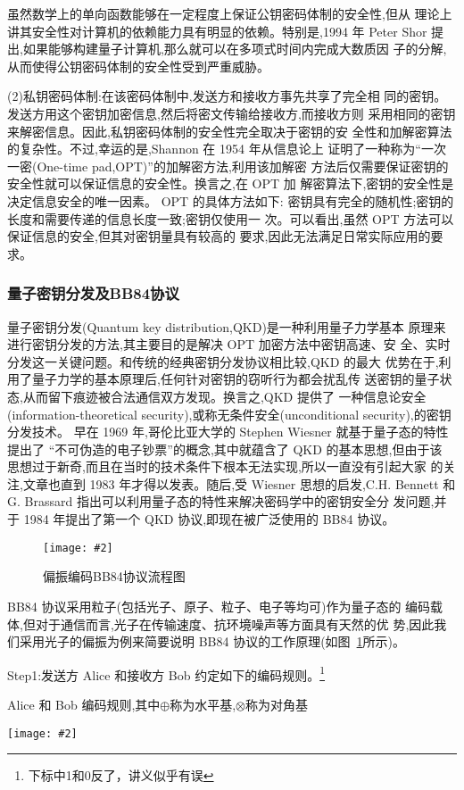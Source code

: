 \documentclass[11pt,a4paper]{ctexart}
\newcommand{\cpic}[2]{
\begin{center}
\texttt{[image: \#2]}
\end{center}
}
\newcommand{\cpicn}[3]
{
\begin{figure}[H]
\cpic{#1}{#2}
\caption{\color{red}#3\label{#2}}
\end{figure}
}
\begin{document}
虽然数学上的单向函数能够在一定程度上保证公钥密码体制的安全性,但从
理论上讲其安全性对计算机的依赖能力具有明显的依赖。特别是,1994 年 Peter
Shor 提出,如果能够构建量子计算机,那么就可以在多项式时间内完成大数质因
子的分解,从而使得公钥密码体制的安全性受到严重威胁。

(2)私钥密码体制:在该密码体制中,发送方和接收方事先共享了完全相
同的密钥。发送方用这个密钥加密信息,然后将密文传输给接收方,而接收方则
采用相同的密钥来解密信息。因此,私钥密码体制的安全性完全取决于密钥的安
全性和加解密算法的复杂性。不过,幸运的是,Shannon 在 1954 年从信息论上
证明了一种称为“一次一密(One-time pad,OPT)”的加解密方法,利用该加解密
方法后仅需要保证密钥的安全性就可以保证信息的安全性。换言之,在 OPT 加
解密算法下,密钥的安全性是决定信息安全的唯一因素。 OPT 的具体方法如下:
密钥具有完全的随机性;密钥的长度和需要传递的信息长度一致;密钥仅使用一
次。可以看出,虽然 OPT 方法可以保证信息的安全,但其对密钥量具有较高的
要求,因此无法满足日常实际应用的要求。
\subsubsection{量子密钥分发及BB84协议}
量子密钥分发(Quantum key distribution,QKD)是一种利用量子力学基本
原理来进行密钥分发的方法,其主要目的是解决 OPT 加密方法中密钥高速、安
全、实时分发这一关键问题。和传统的经典密钥分发协议相比较,QKD 的最大
优势在于,利用了量子力学的基本原理后,任何针对密钥的窃听行为都会扰乱传
送密钥的量子状态,从而留下痕迹被合法通信双方发现。换言之,QKD 提供了
一种信息论安全(information-theoretical security),或称无条件安全(unconditional
security),的密钥分发技术。
早在 1969 年,哥伦比亚大学的 Stephen Wiesner 就基于量子态的特性提出了
“不可伪造的电子钞票”的概念,其中就蕴含了 QKD 的基本思想,但由于该
思想过于新奇,而且在当时的技术条件下根本无法实现,所以一直没有引起大家
的关注,文章也直到 1983 年才得以发表。随后,受 Wiesner 思想的启发,C.H.
Bennett 和 G. Brassard 指出可以利用量子态的特性来解决密码学中的密钥安全分
发问题,并于 1984 年提出了第一个 QKD 协议,即现在被广泛使用的 BB84 协议。
\cpicn{0.3}{BB84}{偏振编码BB84协议流程图}
BB84 协议采用粒子(包括光子、原子、粒子、电子等均可)作为量子态的
编码载体,但对于通信而言,光子在传输速度、抗环境噪声等方面具有天然的优
势,因此我们采用光子的偏振为例来简要说明 BB84 协议的工作原理(如图~\ref{BB84}所示)。

Step1:发送方 Alice 和接收方 Bob 约定如下的编码规则。\footnote{下标中1和0反了，讲义似乎有误}
\begin{table}[H]
  \caption{Alice 和 Bob 编码规则,其中$\oplus$称为水平基,$\otimes$称为对角基 }
  \cpic{0.3}{code}
\end{table}
\end{document}
